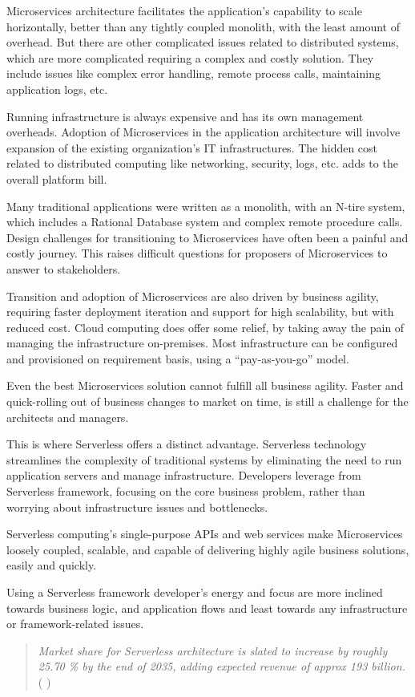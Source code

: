 \documentclass{article}
\begin{document}
\begin{flushleft}
Microservices architecture facilitates the application’s capability to scale horizontally, better than any tightly coupled monolith, with the least amount of overhead. But there are other complicated issues related to distributed systems, which are more complicated requiring a complex and costly solution. They include issues like complex error handling, remote process calls, maintaining application logs, etc.

Running infrastructure is always expensive and has its own management overheads. Adoption of Microservices in the application architecture will involve expansion of the existing organization’s IT infrastructures. The hidden cost related to distributed computing like networking, security, logs, etc. adds to the overall platform bill.

Many traditional applications were written as a monolith, with an N-tire system, which includes a Rational Database system and complex remote procedure calls. Design challenges for transitioning to Microservices have often been a painful and costly journey. This raises difficult questions for proposers of Microservices to answer to stakeholders.

Transition and adoption of Microservices are also driven by business agility, requiring faster deployment iteration and support for high scalability, but with reduced cost. 
Cloud computing does offer some relief, by taking away the pain of managing the infrastructure on-premises. Most infrastructure can be configured and provisioned on requirement basis, using a “pay-as-you-go” model. 

Even the best Microservices solution cannot fulfill all business agility. Faster and quick-rolling out of business changes to market on time, is still a challenge for the architects and managers. 

This is where Serverless offers a distinct advantage. Serverless technology streamlines the complexity of traditional systems by eliminating the need to run application servers and manage infrastructure. Developers leverage from Serverless framework, focusing on the core business problem, rather than worrying about infrastructure issues and bottlenecks.

Serverless computing's single-purpose APIs and web services make Microservices loosely coupled, scalable, and capable of delivering highly agile business solutions, easily and quickly.

Using a Serverless framework developer’s energy and focus are more inclined towards business logic, and application flows and least towards any infrastructure or framework-related issues.
\pagebreak
\end{flushleft}
\begin{quote}
   \textit{Market share for Serverless architecture is slated to increase by roughly 25.70 \% by the end of 2035, adding expected revenue of approx 193 billion. } \\ ( \cite{GMI_3796_2022} )
\end{quote}
\end{document}
